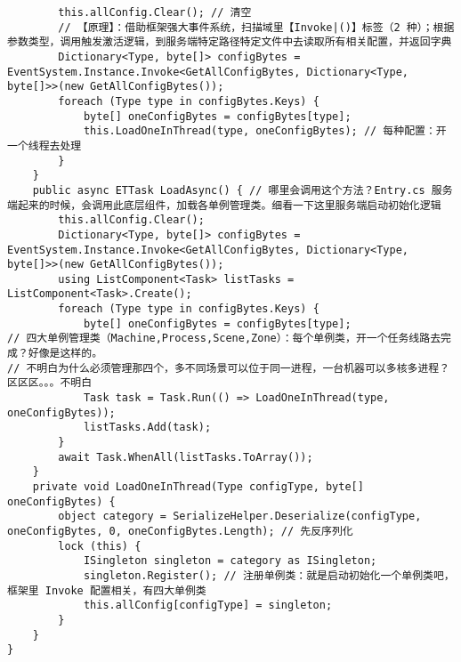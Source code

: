 \documentclass[9pt, b5paper]{article}
\begin{document}
\begin{verbatim}
        this.allConfig.Clear(); // 清空
        // 【原理】：借助框架强大事件系统，扫描域里【Invoke|()】标签（2 种）；根据参数类型，调用触发激活逻辑，到服务端特定路径特定文件中去读取所有相关配置，并返回字典
        Dictionary<Type, byte[]> configBytes = EventSystem.Instance.Invoke<GetAllConfigBytes, Dictionary<Type, byte[]>>(new GetAllConfigBytes());
        foreach (Type type in configBytes.Keys) {
            byte[] oneConfigBytes = configBytes[type];
            this.LoadOneInThread(type, oneConfigBytes); // 每种配置：开一个线程去处理
        }
    }
    public async ETTask LoadAsync() { // 哪里会调用这个方法？Entry.cs 服务端起来的时候，会调用此底层组件，加载各单例管理类。细看一下这里服务端启动初始化逻辑
        this.allConfig.Clear();
        Dictionary<Type, byte[]> configBytes = EventSystem.Instance.Invoke<GetAllConfigBytes, Dictionary<Type, byte[]>>(new GetAllConfigBytes());
        using ListComponent<Task> listTasks = ListComponent<Task>.Create();
        foreach (Type type in configBytes.Keys) {
            byte[] oneConfigBytes = configBytes[type];
// 四大单例管理类（Machine,Process,Scene,Zone）：每个单例类，开一个任务线路去完成？好像是这样的。
// 不明白为什么必须管理那四个，多不同场景可以位于同一进程，一台机器可以多核多进程？区区区。。。不明白
            Task task = Task.Run(() => LoadOneInThread(type, oneConfigBytes)); 
            listTasks.Add(task);
        }
        await Task.WhenAll(listTasks.ToArray());
    }
    private void LoadOneInThread(Type configType, byte[] oneConfigBytes) {
        object category = SerializeHelper.Deserialize(configType, oneConfigBytes, 0, oneConfigBytes.Length); // 先反序列化
        lock (this) {
            ISingleton singleton = category as ISingleton;
            singleton.Register(); // 注册单例类：就是启动初始化一个单例类吧，框架里 Invoke 配置相关，有四大单例类
            this.allConfig[configType] = singleton;
        }
    }
}
\end{verbatim}
\end{document}
